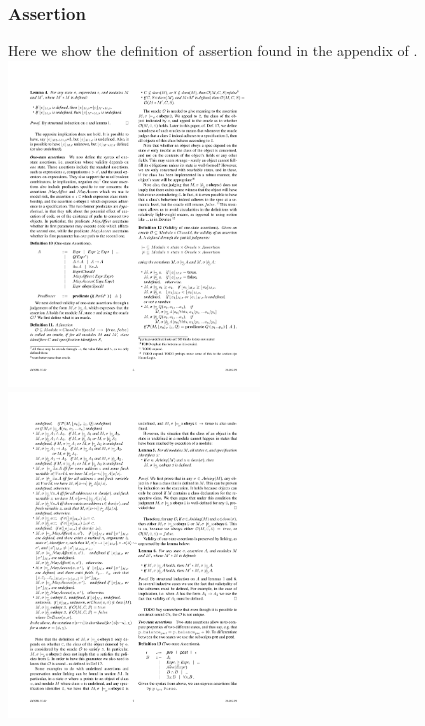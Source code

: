 \documentclass[a4paper,11pt,twoside]{article}
\begin{document}
{\subsubsection{Assertion}\label{app:assertion}
Here we show the definition of assertion found in the appendix of \cite{drossopoulou2015b}.\\
\includegraphics[width=0.5\textwidth,valign=t]{figures/app_assertion1.pdf}
\includegraphics[width=0.5\textwidth,valign=t]{figures/app_assertion2.pdf}

}
\end{document}

